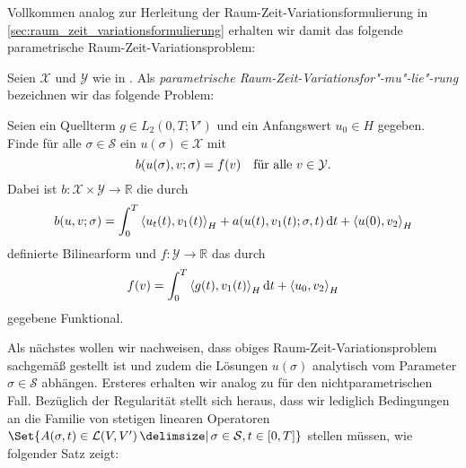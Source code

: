 Vollkommen analog zur Herleitung der Raum-Zeit-Variationsformulierung in \autoref{sec:raum_zeit_variationsformulierung} erhalten wir damit das folgende parametrische Raum-Zeit-Variationsproblem:

\begin{Definition}
\label{definition:pp:variationsformulierung}
    Seien $\mathcal X$ und $\mathcal Y$ wie in .
    Als \emph{parametrische Raum-Zeit-Variationsfor"-mu"-lie"-rung}
    bezeichnen wir das folgende Problem:

    Seien ein Quellterm $g \in L_{2}(0, T; V')$ und ein Anfangswert $u_{0} \in H$ gegeben.
    Finde für alle $\sigma \in \mathcal S$ ein $u(\sigma) \in \mathcal X$ mit
    \begin{equation}
        \label{eq:pp:var_all_problem}
        b(u(\sigma), v; \sigma) = f(v) \quad \fa v \in \mathcal Y.
    \end{equation}
    Dabei ist $b \colon \mathcal X \times \mathcal Y \to \mathbb{R}$ die durch
    \begin{equation}
        \label{eq:pp:var_all_bf_b}
        b(u, v; \sigma) = \int_{0}^{T} \skprod{u_{t}(t)}{v_{1}(t)}_{H} + a(u(t), v_{1}(t); \sigma, t) \diff t + \skprod{u(0)}{v_{2}}_{H}
    \end{equation}
    definierte Bilinearform und $f \colon \mathcal Y \to \mathbb{R}$ das durch
    \begin{equation}
        \label{eq:pp:var_all_f}
        f(v) = \int_{0}^{T} \skprod{g(t)}{v_{1}(t)}_{H} \diff t + \skprod{u_{0}}{v_{2}}_{H}
    \end{equation}
    gegebene Funktional.
\end{Definition}

Als nächstes wollen wir nachweisen, dass obiges Raum-Zeit-Variationsproblem sachgemäß gestellt ist und zudem die Lösungen $u(\sigma)$ analytisch vom Parameter $\sigma \in \mathcal S$ abhängen.
Ersteres erhalten wir analog zu  für den nichtparametrischen Fall.
Bezüglich der Regularität stellt sich heraus, dass wir lediglich Bedingungen an die Familie von stetigen linearen Operatoren $\Set{ A(\sigma, t) \in \mathcal L(V, V') \given \sigma \in \mathcal S, t \in [0, T] }$ stellen müssen, wie folgender Satz zeigt:

